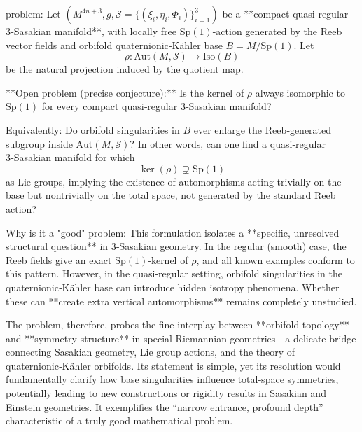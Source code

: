 problem:  
Let \( (M^{4n+3}, g, \mathcal{S} = \{(\xi_i,\eta_i,\Phi_i)\}_{i=1}^{3}) \) be a **compact quasi‑regular 3‑Sasakian manifold**, with locally free \(\mathrm{Sp}(1)\)-action generated by the Reeb vector fields and orbifold quaternionic‑Kähler base \( B = M / \mathrm{Sp}(1)\).  
Let  
\[
\rho : \mathrm{Aut}(M,\mathcal{S}) \longrightarrow \mathrm{Iso}(B)
\]
be the natural projection induced by the quotient map.

**Open problem (precise conjecture):**  
Is the kernel of \(\rho\) always isomorphic to \(\mathrm{Sp}(1)\) for every compact quasi‑regular 3‑Sasakian manifold?  

Equivalently:  
Do orbifold singularities in \(B\) ever enlarge the Reeb‑generated subgroup inside \(\mathrm{Aut}(M,\mathcal{S})\)?  
In other words, can one find a quasi‑regular 3‑Sasakian manifold for which  
\[
\ker(\rho) \supsetneq \mathrm{Sp}(1)
\]
as Lie groups, implying the existence of automorphisms acting trivially on the base but nontrivially on the total space, not generated by the standard Reeb action?

Why is it a "good" problem:  
This formulation isolates a **specific, unresolved structural question** in 3‑Sasakian geometry. In the regular (smooth) case, the Reeb fields give an exact \(\mathrm{Sp}(1)\)-kernel of \(\rho\), and all known examples conform to this pattern. However, in the quasi‑regular setting, orbifold singularities in the quaternionic‑Kähler base can introduce hidden isotropy phenomena. Whether these can **create extra vertical automorphisms** remains completely unstudied.  

The problem, therefore, probes the fine interplay between **orbifold topology** and **symmetry structure** in special Riemannian geometries—a delicate bridge connecting Sasakian geometry, Lie group actions, and the theory of quaternionic‑Kähler orbifolds. Its statement is simple, yet its resolution would fundamentally clarify how base singularities influence total‑space symmetries, potentially leading to new constructions or rigidity results in Sasakian and Einstein geometries. It exemplifies the “narrow entrance, profound depth” characteristic of a truly good mathematical problem.